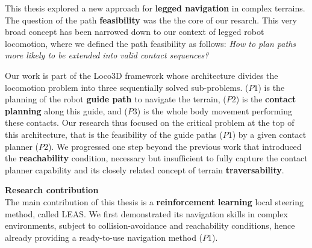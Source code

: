 

This thesis explored a new approach for \textbf{legged navigation} in complex terrains. 
The question of the path \textbf{feasibility} was the the core of our resarch.
This very broad concept has been narrowed down to our context of legged robot locomotion, where we defined the path feasibility as follows:
\textit{How to plan paths more likely to be extended into valid contact sequences?}

\hfill \break

Our work is part of the Loco3D framework whose architecture divides the locomotion problem into three sequentially solved sub-problems. ($P1$) is the planning of the robot \textbf{guide path} to navigate the terrain, ($P2$) is the \textbf{contact planning} along this guide, and ($P3$) is the whole body movement performing these contacts.
Our research thus focused on the critical problem at the top of this architecture, that is the feasibility of the guide paths ($P1$) by a given contact planner ($P2$). We progressed one step beyond the previous work \cite{RB-PRM} that introduced the \textbf{reachability} condition, necessary but insufficient to fully capture the contact planner capability and its closely related concept of terrain \textbf{traversability}.

\hfill \break
\hfill \break

\noindent\textbf{Research contribution}\\

The main contribution of this thesis is a \textbf{reinforcement learning} local steering method, called LEAS. We first demonstrated its navigation skills in complex environments, subject to collision-avoidance and reachability conditions, hence already providing a ready-to-use navigation method ($P1$).


